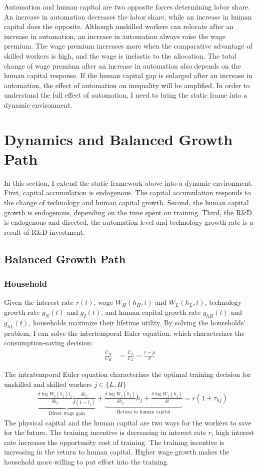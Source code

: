 \documentclass[12pt]{article}
\begin{document}
Automation and human capital are two opposite forces determining labor share. An increase in automation decreases the labor share, while an increase in human capital does the opposite. Although unskilled workers can relocate after an increase in automation, an increase in automation always raise the wage premium. The wage premium increases more when the comparative advantage of skilled workers is high, and the wage is inelastic to the allocation. The total change of wage premium after an increase in automation also depends on the human capital response. If the human capital gap is enlarged after an increase in automation, the effect of automation on inequality will be amplified. In order to understand the full effect of automation, I need to bring the static frame into a dynamic environment. 


\section{Dynamics and Balanced Growth Path}
In this section, I extend the static framework above into a dynamic environment. First, capital accumulation is endogenous. The capital accumulation responds to the change of technology and human capital growth. Second, the human capital growth is endogenous, depending on the time spent on training. Third, the R\&D is endogenous and directed, the automation level and technology growth rate is a result of R\&D investment.

\subsection{Balanced Growth Path}
\subsubsection*{Household}
Given the interest rate $r(t)$, wage $W_H(h_H,t)$ and $W_L(h_L,t)$, technology growth rate $g_N(t)$ and $g_I(t)$, and human capital growth rate $g_{hH}(t)$ and  $g_{hL}(t)$, households maximize their lifetime utility. By solving the households' problem, I can solve the intertemporal Euler equation, which characterizes the consumption-saving decision: 
\begin{align}
\frac{\dot{C}_H}{C_H} &= \frac{\dot{C}_L}{C_L}  = \frac{r-\rho}{\theta} 
\end{align}

The intratemporal Euler equation characterizes the optimal training decision for unskilled and skilled workers $j\in\{L,H\}$
\begin{align}
&\underbrace{\frac{\delta \log W_j(h_j)l_j}{\delta h_j}\frac{\delta \dot{h}_j}{\delta (1-l_j)}}_{\text{Direct wage gain}}+\underbrace{\frac{\delta \log W_j(h_j)}{\delta h_j}\dot{h}_j+\frac{\delta \log W_j(h_j)}{\delta t}}_{\text{Return to human capital}}= r(1+\tau_{hj})
\end{align}
The physical capital and the human capital are two ways for the workers to save for the future. The training incentive is decreasing in interest rate $r$, high interest rate increases the opportunity cost of training. The training incentive is increasing in the return to human capital. Higher wage growth makes the household more willing to put effort into the training.
\end{document}
